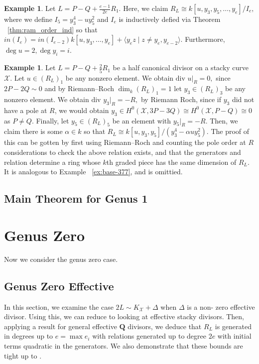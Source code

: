 \documentclass{amsart}
\theoremstyle{plain}
\theoremstyle{definition}
\newtheorem{example}[thm]{Example}
\theoremstyle{remark}
\numberwithin{equation}{section}
\newcommand\ssec{\subsection}
\newcommand \sx{\mathscr X}
\newcommand \di{\text{div }}
\newcommand \halfcan{L}
\begin{document}
\begin{example}
\label{eg:exception-1-e}
Let $L = P - Q + \frac{e-1}{2e}R_1.$ Here, we claim $R_L \cong k[u,y_3, y_5, \ldots, y_e]/I_e,$ where we define $I_5 = y_3^4 - uy_5^2$ and $I_e$ is inductively defied via Theorem ~\ref{thm:ram_order_ind} so that $in(I_e) = in(I_{e-2})k[u, y_3,\ldots, y_e] + \langle y_e z \mid z \neq y_e, y_{e-2} \rangle.$
Furthermore, $\deg u = 2, \deg y_i = i$.
\end{example}
\fi

\begin{example}
\label{eg:exception-1-5}
Let $L = P - Q + \frac{2}{5}R_1$ be a half canonical divisor on a stacky curve $\sx$. Let $u \in (R_L)_1$ be any nonzero element. We obtain $\di u|_R = 0,$ since $2P -2Q \sim 0$ and by Riemann--Roch $\dim_k (R_L)_1 = 1$ let $y_3 \in (R_L)_3$ be any nonzero element. We obtain $\di y_3|_R = - R,$ by Riemann Roch, since if $y_3$ did not have a pole at $R$, we would obtain $y_3 \in H^0(\sx,3P-3Q) \cong H^0(\sx,P-Q) \cong 0$ as $P \neq Q$. Finally, let $y_5 \in (R_L)_5$ be an element with $y_5|_R = -R$. Then, we claim there is some $\alpha \in k$ so that
$R_L \cong k[u,y_3, y_5]/(y_3^4 - \alpha uy_5^2).$
The proof of this can be gotten by first using Riemann--Roch and counting the pole order at $R$ considerations to check the above relation exists, and that the generators and relation determine a ring whose $k$th graded piece has the same dimension of $R_L$. It is analogous to Example ~\ref{ex:base-377}, and is omittied.
\end{example}


\ssec{Main Theorem for Genus 1}
\label{ssec:main_g_1}



\section{Genus Zero}
\label{sec:g_0}
Now we consider the genus zero case.

\ssec{Genus Zero Effective}
\label{ssec:g_0_effective}

In this section, we examine the case $2\halfcan\sim K_\sx+\Delta$ 
when $\Delta$ is a non- zero effective divisor.  Using this, we can 
reduce to looking at effective stacky divisors.  Then, applying a 
result for general effective $\mathbf{Q}$ divisors, we deduce that $
R_{\halfcan}$ is generated in degrees up to $e=\max{e_i}$ with 
relations generated up to degree $2e$ with initial terms quadratic 
in the generators.  We also demonstrate that these bounds are tight 
up to .
\end{document}

